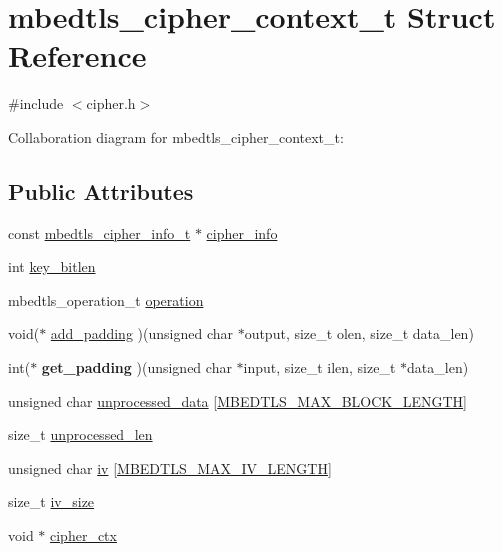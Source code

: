 \hypertarget{structmbedtls__cipher__context__t}{}\section{mbedtls\+\_\+cipher\+\_\+context\+\_\+t Struct Reference}
\label{structmbedtls__cipher__context__t}


{\ttfamily \#include $<$cipher.\+h$>$}



Collaboration diagram for mbedtls\+\_\+cipher\+\_\+context\+\_\+t\+:
\subsection*{Public Attributes}
\begin{DoxyCompactItemize}
\item 
const \mbox{\hyperlink{structmbedtls__cipher__info__t}{mbedtls\+\_\+cipher\+\_\+info\+\_\+t}} $\ast$ \mbox{\hyperlink{structmbedtls__cipher__context__t_a7673da39ff63a88c9b85769048884dae}{cipher\+\_\+info}}
\item 
int \mbox{\hyperlink{structmbedtls__cipher__context__t_ac949d799444e6379acf0125891c04763}{key\+\_\+bitlen}}
\item 
mbedtls\+\_\+operation\+\_\+t \mbox{\hyperlink{structmbedtls__cipher__context__t_a0075f60f220daa87578223a2022ba405}{operation}}
\item 
void($\ast$ \mbox{\hyperlink{structmbedtls__cipher__context__t_a1c9ca536bde6b0da3bd3c57a50c1ea8f}{add\+\_\+padding}} )(unsigned char $\ast$output, size\+\_\+t olen, size\+\_\+t data\+\_\+len)
\item 
\mbox{\label{structmbedtls__cipher__context__t_a60c17ef8d5ea5490d5927ae95262a967}} 
int($\ast$ {\bfseries get\+\_\+padding} )(unsigned char $\ast$input, size\+\_\+t ilen, size\+\_\+t $\ast$data\+\_\+len)
\item 
unsigned char \mbox{\hyperlink{structmbedtls__cipher__context__t_a3fc86dfa20e0131377692ee07fb5b8f0}{unprocessed\+\_\+data}} \mbox{[}\mbox{\hyperlink{cipher_8h_ab8f30dc90403204515f868c3b6196ffd}{M\+B\+E\+D\+T\+L\+S\+\_\+\+M\+A\+X\+\_\+\+B\+L\+O\+C\+K\+\_\+\+L\+E\+N\+G\+TH}}\mbox{]}
\item 
size\+\_\+t \mbox{\hyperlink{structmbedtls__cipher__context__t_ad9bb94ad0e914bdceb20190cfebfc702}{unprocessed\+\_\+len}}
\item 
unsigned char \mbox{\hyperlink{structmbedtls__cipher__context__t_a19262f2c275b31180e7412f4bcef0e7f}{iv}} \mbox{[}\mbox{\hyperlink{cipher_8h_aec294721b811aa0f7dcc940029fd8aab}{M\+B\+E\+D\+T\+L\+S\+\_\+\+M\+A\+X\+\_\+\+I\+V\+\_\+\+L\+E\+N\+G\+TH}}\mbox{]}
\item 
size\+\_\+t \mbox{\hyperlink{structmbedtls__cipher__context__t_af11d1d21da68ef00a46d96d9de326206}{iv\+\_\+size}}
\item 
void $\ast$ \mbox{\hyperlink{structmbedtls__cipher__context__t_a5b7e2044b5186a4ee57456f6f927ad80}{cipher\+\_\+ctx}}
\end{DoxyCompactItemize}


